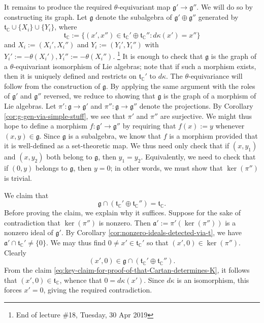 \documentclass[reqno]{amsart} 
\begin{document}
It remains to produce the required $\theta$-equivariant map $\mathfrak{g} ' \rightarrow \mathfrak{g} ''$.  We will do so by constructing its graph.  Let $\mathfrak{g}$ denote the subalgebra of $\mathfrak{g} ' \oplus \mathfrak{g} ''$ generated by $\mathfrak{t}_{\mathbb{C}} \cup \{X_i\} \cup \{Y_i\}$, where
\begin{equation*}
  \mathfrak{t}_{\mathbb{C}} := \{(x', x'' ) \in \mathfrak{t}_{\mathbb{C}} ' \oplus \mathfrak{t}_{\mathbb{C}} '' : d \kappa(x') = x'' \}
\end{equation*}
and $X_i := (X_i', X_i'')$ and $Y_i := (Y_i', Y_i'')$ with $Y_i' := -\theta(X_i'), Y_i'' := -\theta(X_i'')$.  \footnote{End of lecture \#18, Tuesday, 30 Apr 2019} It is enough to check that $\mathfrak{g}$ is the graph of a $\theta$-equivariant isomorphism of Lie algebras; note that if such a morphism exists, then it is uniquely defined and restricts on $\mathfrak{t}_{\mathbb{C} }'$ to $d \kappa$.  The $\theta$-equivariance will follow from the construction of $\mathfrak{g}$.  By applying the same argument with the roles of $\mathfrak{g} '$ and $\mathfrak{g} ''$ reversed, we reduce to showing that $\mathfrak{g}$ is the graph of a morphism of Lie algebras.  Let $\pi ' : \mathfrak{g} \rightarrow \mathfrak{g} '$ and $\pi '' : \mathfrak{g} \rightarrow \mathfrak{g} ''$ denote the projections.  By Corollary \ref{cor:g-gen-via-simple-stuff}, we see that $\pi '$ and $\pi ''$ are surjective.  We might thus hope to define a morphism $f : \mathfrak{g} ' \rightarrow \mathfrak{g} ''$ by requiring that $f(x) := y$ whenever $(x,y) \in \mathfrak{g}$.  Since $\mathfrak{g}$ is a subalgebra, we know that $f$ is a morphism provided that it is well-defined as a set-theoretic map.  We thus need only check that if $(x,y_1)$ and $(x,y_2)$ both belong to $\mathfrak{g}$, then $y_1 = y_2$.  Equivalently, we need to check that if $(0,y)$ belongs to $\mathfrak{g}$, then $y = 0$; in other words, we must show that $\ker(\pi '')$ is trivial.

We claim that
\begin{equation}\label{eq:key-claim-for-proof-of-that-Cartan-determines-K}
  \mathfrak{g} \cap (\mathfrak{t}_{\mathbb{C}}' \oplus
  \mathfrak{t}_{\mathbb{C} }'')
  =
  \mathfrak{t}_{\mathbb{C}}.
\end{equation}
Before proving the claim, we explain why it suffices.  Suppose for the sake of contradiction that $\ker(\pi '')$ is nonzero.  Then $\mathfrak{a} ' := \pi '(\ker(\pi ''))$ is a nonzero ideal of $\mathfrak{g}'$.  By Corollary \ref{cor:nonzero-ideals-detected-via-t}, we have $\mathfrak{a} ' \cap \mathfrak{t}_{\mathbb{C}}' \neq \{0\}$.  We may thus find $0 \neq x' \in \mathfrak{t}_{\mathbb{C} }'$ so that $(x', 0) \in \ker(\pi '')$.  Clearly
\begin{equation}\label{eq:}
  (x',0) \in \mathfrak{g} \cap (\mathfrak{t}_{\mathbb{C}}' \oplus
  \mathfrak{t}_{\mathbb{C} }'').
\end{equation}
From the claim \eqref{eq:key-claim-for-proof-of-that-Cartan-determines-K}, it follows that $(x', 0) \in \mathfrak{t}_{\mathbb{C}}$, whence that $0 = d \kappa(x')$.  Since $d \kappa$ is an isomorphism, this forces $x' = 0$, giving the required contradiction.
\end{document}
